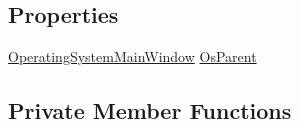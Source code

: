 \subsection*{Properties}
\begin{DoxyCompactItemize}
\item 
\hyperlink{class_c_p_u___o_s___simulator_1_1_operating_system_main_window}{Operating\+System\+Main\+Window} \hyperlink{class_c_p_u___o_s___simulator_1_1_utilisation_window_a7fe83f09dda5e9ac3d36c2b2736d74ce}{Os\+Parent}
\end{DoxyCompactItemize}
\subsection*{Private Member Functions}
